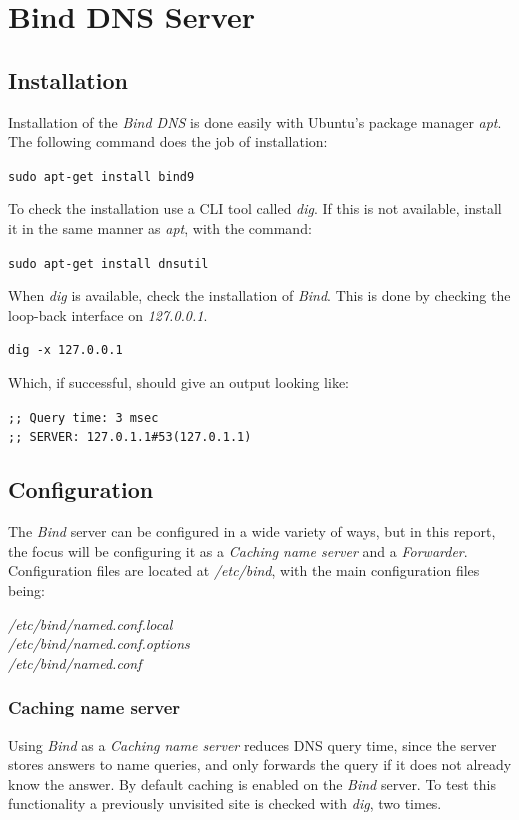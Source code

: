 \section{Bind DNS Server}

\subsection{Installation}
Installation of the \emph{Bind DNS} is done easily with Ubuntu's package manager \emph{apt}. The following command does the job of installation:

\texttt{sudo apt-get install bind9}

To check the installation use a CLI tool called \emph{dig}. If this is not available, install it in the same manner as \emph{apt}, with the command:

\texttt{sudo apt-get install dnsutil}

When \emph{dig} is available, check the installation of \emph{Bind}. This is done by checking the loop-back interface on \emph{127.0.0.1}.

\texttt{dig -x 127.0.0.1}

Which, if successful, should give an output looking like:

\texttt{;; Query time: 3 msec}\\
\texttt{;; SERVER: 127.0.1.1\#53(127.0.1.1)}

\subsection{Configuration}
The \emph{Bind} server can be configured in a wide variety of ways, but in this report, the focus will be configuring it as a \emph{Caching name server} and a \emph{Forwarder}. Configuration files are located at \emph{/etc/bind}, with the main configuration files being:

\emph{/etc/bind/named.conf.local}\\
\emph{/etc/bind/named.conf.options}\\
\emph{/etc/bind/named.conf}\\

\subsubsection{Caching name server}
Using \emph{Bind} as a \emph{Caching name server} reduces DNS query time, since the server stores answers to name queries, and only forwards the query if it does not already know the answer.
By default caching is enabled on the \emph{Bind} server. To test this functionality a previously unvisited site is checked with \emph{dig}, two times.

